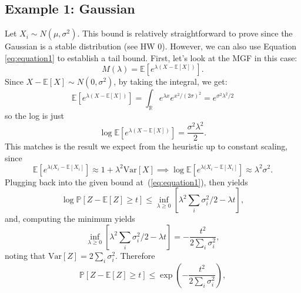 \documentclass[11pt]{article}
\newcommand{\var}[1]{\mathrm{Var}\left[{#1}\right]}
\newcommand{\ex}[1]{\mathbb{E}\left[{#1}\right]}
\newcommand{\pp}[1]{\mathbb{P}\left[{#1}\right]}
\newcommand{\reals}{\mathbb{R}}
\begin{document}
\subsection{Example 1: Gaussian}
Let $X_i \sim N(\mu, \sigma^2)$. This bound is relatively straightforward to prove since the Gaussian is a stable distribution (see HW 0). However, we can also use Equation \ref{eq:equation1} to establish a tail bound. First, let's look at the MGF in this case:
\[
  M(\lambda) = \ex{e^{\lambda(X - \ex X)}}.
\]
Since $X - \ex X \sim N(0, \sigma^2)$, by taking the integral, we get:
\[
  \ex{e^{\lambda(X - \ex{X})}} = \int_\reals e^{\lambda x}e^{x^2/(2\sigma)^2} = e^{\sigma^2\lambda^2/2}
\]
so the log is just
\[
  \log \ex{e^{\lambda(X - \ex X)}} = \frac{\sigma^2\lambda^2}2.
\]
This matches is the result we expect from the heuristic up to constant scaling, since
\[
  \ex{e^{\lambda(X_i - \ex{X_i}}} \approx 1 + \lambda^2 \var{X} \implies \log \ex{e^{\lambda(X_i - \ex{X_i}}} \approx \lambda^2\sigma^2.
\]
Plugging back into the given bound at~(\ref{eq:equation1}), then yields
\[
  \log \pp{Z - \ex{Z} \ge t} \le \inf_{\lambda \ge 0} \left[\lambda^2 \sum_i \sigma_i^2/2 - \lambda t\right],
\]
and, computing the minimum yields
\[
  \inf_{\lambda \ge 0} \left[\lambda^2 \sum_i \sigma_i^2/2 - \lambda t\right] = -\frac{t^2}{2\sum_i \sigma_i^2},
\]
noting that $\var{Z} = 2 \sum_i \sigma_i^2$. Therefore
\[
  \pp{Z - \ex{Z} \ge t} \le \exp\left(-\frac{t^2}{2\sum_i \sigma_i^2}\right),
\]
\end{document}
